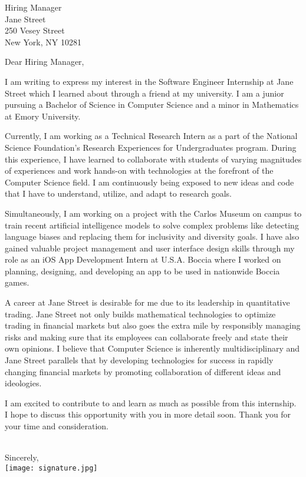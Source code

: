 \documentclass[letterpaper,12pt]{letter}
\date{}
\begin{document}
\begin{letter}{%
    Hiring Manager \\ 
	Jane Street \\
	250 Vesey Street \\
    New York, NY 10281
}

\opening{Dear Hiring Manager,}

I am writing to express my interest in the Software Engineer Internship at Jane Street
which I learned about through a friend at my university. I am a junior pursuing 
a Bachelor of Science in Computer Science and a minor in Mathematics at Emory University.

Currently, I am working as a Technical Research Intern as a part of the National Science Foundation's 
Research Experiences for Undergraduates program. During this experience, I have learned to 
collaborate with students of varying magnitudes of experiences and work hands-on with technologies at 
the forefront of the Computer Science field. I am continuously being exposed to new ideas 
and code that I have to understand, utilize, and adapt to research goals. 

Simultaneously, I am working on a project with the Carlos Museum on campus to train recent 
artificial intelligence models to solve complex problems like detecting language biases and 
replacing them for inclusivity and diversity goals. I have also gained valuable project management 
and user interface design skills through my role as an iOS App Development Intern at U.S.A. Boccia 
where I worked on planning, designing, and developing an app to be used in nationwide Boccia games. 

A career at Jane Street is desirable for me due to its leadership in quantitative trading. 
Jane Street not only builds mathematical technologies to optimize trading in financial markets
but also goes the extra mile by responsibly managing risks and making sure that its employees can 
collaborate freely and state their own opinions. 
I believe that Computer Science is inherently multidisciplinary and Jane Street parallels that 
by developing technologies for success in rapidly changing financial markets by promoting collaboration
of different ideas and ideologies.

I am excited to contribute to and learn as much as possible from this internship. I hope to discuss
this opportunity with you in more detail soon. Thank you for your time and consideration. \\\\

\closing{Sincerely, \\
\vspace{10pt}
\texttt{[image: signature.jpg]}}


\end{letter}

\end{document}
